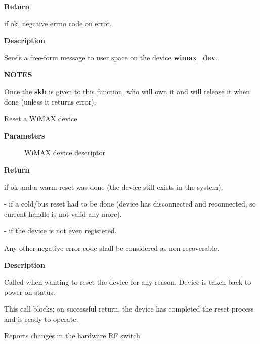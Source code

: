 \documentclass[a4paper,8pt,english]{sphinxmanual}
\begin{document}
\textbf{Return}

 if ok, negative errno code on error.

\textbf{Description}

Sends a free-form message to user space on the device \textbf{wimax\_dev}.

\textbf{NOTES}

Once the \textbf{skb} is given to this function, who will own it and will
release it when done (unless it returns error).

\begin{fulllineitems}
\label{networking/kapi:c.wimax_reset}
Reset a WiMAX device

\end{fulllineitems}


\textbf{Parameters}
\begin{description}
\item[{}] \leavevmode
WiMAX device descriptor

\end{description}

\textbf{Return}

 if ok and a warm reset was done (the device still exists in
the system).

- if a cold/bus reset had to be done (device has
disconnected and reconnected, so current handle is not valid
any more).

- if the device is not even registered.

Any other negative error code shall be considered as
non-recoverable.

\textbf{Description}

Called when wanting to reset the device for any reason. Device is
taken back to power on status.

This call blocks; on successful return, the device has completed the
reset process and is ready to operate.

\begin{fulllineitems}
\label{networking/kapi:c.wimax_report_rfkill_hw}
Reports changes in the hardware RF switch

\end{fulllineitems}
\end{document}
